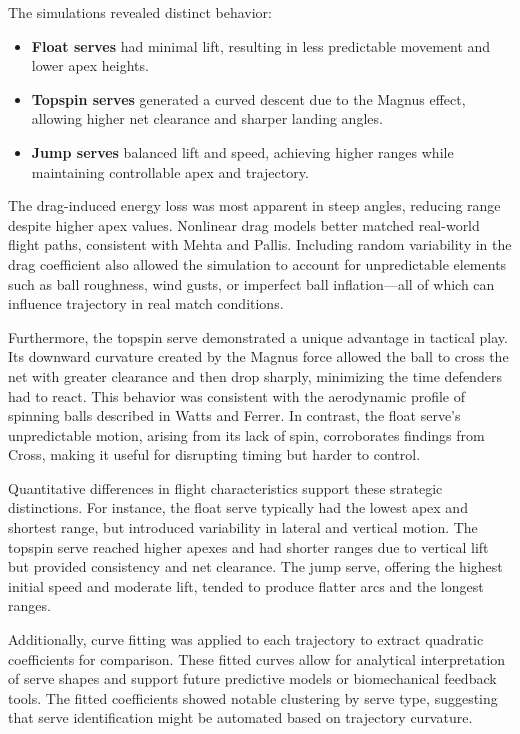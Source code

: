 \documentclass[11pt]{article}
\begin{document}
The simulations revealed distinct behavior:
\begin{itemize}
  \item \textbf{Float serves} had minimal lift, resulting in less predictable movement and lower apex heights.
  \item \textbf{Topspin serves} generated a curved descent due to the Magnus effect, allowing higher net clearance and sharper landing angles.
  \item \textbf{Jump serves} balanced lift and speed, achieving higher ranges while maintaining controllable apex and trajectory.
\end{itemize}

The drag-induced energy loss was most apparent in steep angles, reducing range despite higher apex values. Nonlinear drag models better matched real-world flight paths, consistent with Mehta and Pallis\cite{mehta2001sports}. Including random variability in the drag coefficient also allowed the simulation to account for unpredictable elements such as ball roughness, wind gusts, or imperfect ball inflation—all of which can influence trajectory in real match conditions.

Furthermore, the topspin serve demonstrated a unique advantage in tactical play. Its downward curvature created by the Magnus force allowed the ball to cross the net with greater clearance and then drop sharply, minimizing the time defenders had to react. This behavior was consistent with the aerodynamic profile of spinning balls described in Watts and Ferrer\cite{watts1987curveball}. In contrast, the float serve's unpredictable motion, arising from its lack of spin, corroborates findings from Cross\cite{cross2011float}, making it useful for disrupting timing but harder to control.

Quantitative differences in flight characteristics support these strategic distinctions. For instance, the float serve typically had the lowest apex and shortest range, but introduced variability in lateral and vertical motion. The topspin serve reached higher apexes and had shorter ranges due to vertical lift but provided consistency and net clearance. The jump serve, offering the highest initial speed and moderate lift, tended to produce flatter arcs and the longest ranges.

Additionally, curve fitting was applied to each trajectory to extract quadratic coefficients for comparison. These fitted curves allow for analytical interpretation of serve shapes and support future predictive models or biomechanical feedback tools. The fitted coefficients showed notable clustering by serve type, suggesting that serve identification might be automated based on trajectory curvature.
\end{document}
